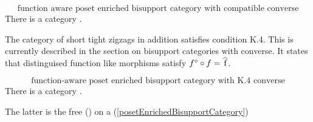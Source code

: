 \begin{aside}
\begin{equation}
\label{functionAwarePosetEnrichedBisupportWithConverse}
\text{function aware poset enriched bisupport category with compatible converse}
\end{equation}
There is a category . 

The category of short tight zigzags in addition satisfies condition K.4.
This is currently described in the section on bisupport categories with converse. It states that distinguised function like morphisms satisfy
$\converse{f} \circ f = \rng{f}$.

\begin{equation}
\label{functionAwarePosetEnrichedBisupportWithK4Converse}
\text{function-aware poset enriched bisupport category with K.4 converse}
\end{equation}
There is a category .

The latter is the free 
() 
on a
(\ref{posetEnrichedBisupportCategory}) 
\end{aside}

